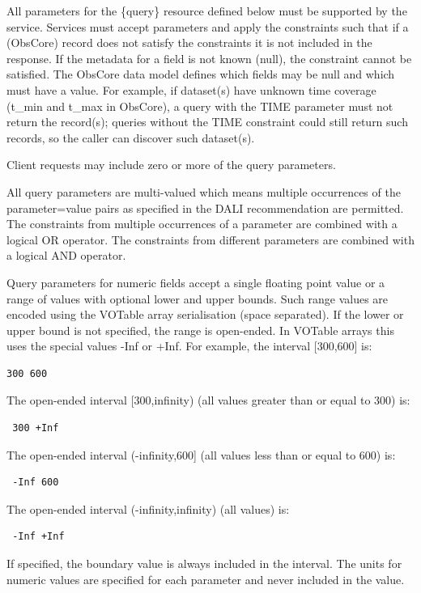 \documentclass[11pt,a4paper]{ivoa}
\begin{document}
All parameters for the \{query\} resource defined below must be supported by the service. Services must accept parameters and apply the constraints such that if a (ObsCore) record does not satisfy the constraints it is not included in the response. If the metadata for a field is not known (null), the constraint cannot be satisfied. The ObsCore data model defines which fields may be null and which must have a value. For example, if dataset(s) have unknown time coverage (t\_min and t\_max in ObsCore), a query with the TIME parameter must not return the record(s); queries without the TIME constraint could still return such records, so the caller can discover such dataset(s).

Client requests may include zero or more of the query parameters.

All query parameters are multi-valued which means multiple occurrences of the parameter=value pairs as specified in the DALI recommendation are permitted. The constraints from multiple occurrences of a parameter are combined with a logical OR operator. The constraints from different parameters are combined with a logical AND operator.

Query parameters for numeric fields accept a single floating point value or a range of values with optional lower and upper bounds. Such range values are encoded using the VOTable array serialisation (space separated). If  the lower or upper bound is not specified, the range is open-ended. In VOTable arrays this uses the special values -Inf or +Inf. For example, the interval [300,600] is:

\begin{lstlisting}
300 600 
\end{lstlisting}
The open-ended interval [300,infinity) (all values greater than or equal to 300) is:

\begin{lstlisting}
 300 +Inf 
\end{lstlisting}
The open-ended interval (-infinity,600] (all values less than or equal to 600) is:

\begin{lstlisting}
 -Inf 600 
\end{lstlisting}
 The open-ended interval (-infinity,infinity) (all values) is: 

\begin{lstlisting}
 -Inf +Inf 
\end{lstlisting}
If specified, the boundary value is always included in the interval.
The units for numeric values are specified for each parameter and never included in the value.
 
\end{document}
